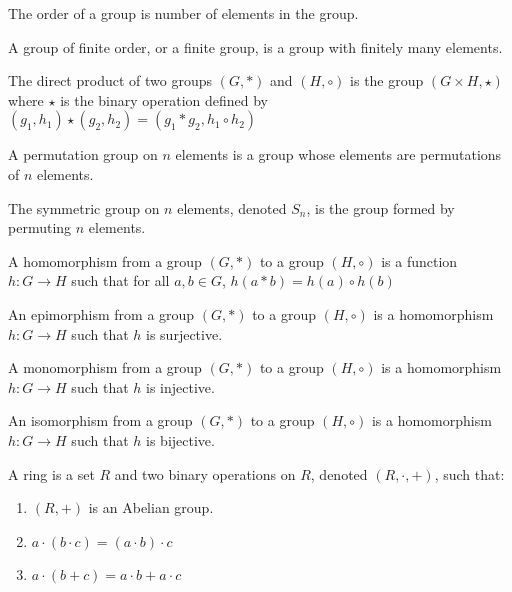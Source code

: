     \begin{definition}
        The order of a group is number of elements in the
        group.
    \end{definition}
    \begin{definition}
        A group of finite order, or a finite group,
        is a group with finitely many elements.
    \end{definition}
    \begin{definition}
        The direct product of two groups $(G,*)$ and
        $(H,\circ)$ is the group  $({G}\times{H},\star)$
        where $\star$ is the binary operation defined by
        $(g_{1},h_{1})\star(g_{2},h_{2})%
         =(g_{1}*g_{2},{h_{1}}\circ{h_{2}})$
    \end{definition}
    \begin{definition}
        A permutation group on $n$ elements is a
        group whose elements are permutations of
        $n$ elements.
    \end{definition}
    \begin{definition}
        The symmetric group on $n$ elements,
        denoted $S_{n}$, is the group formed by
        permuting $n$ elements.
    \end{definition}
    \begin{definition}
        A homomorphism from a group $(G,*)$ to
        a group $(H,\circ)$ is a function
        $h:{G}\rightarrow{H}$ such that for all
        ${a,b}\in{G}$, $h(a*b)={h(a)}\circ{h(b)}$
    \end{definition}
    \begin{definition}
        An epimorphism from a group $(G,*)$ to
        a group $(H,\circ)$ is a homomorphism
        $h:{G}\rightarrow{H}$ such that
        $h$ is surjective.
    \end{definition}
    \begin{definition}
        A monomorphism from a group $(G,*)$ to
        a group $(H,\circ)$ is a homomorphism
        $h:{G}\rightarrow{H}$ such that
        $h$ is injective.
    \end{definition}
    \begin{definition}
        An isomorphism from a group $(G,*)$ to
        a group $(H,\circ)$ is a homomorphism
        $h:{G}\rightarrow{H}$ such that
        $h$ is bijective.
    \end{definition}
    \begin{definition}
        A ring is a set $R$ and two binary operations
        on $R$, denoted $(R,\cdot,+)$, such that:
        \begin{enumerate}
            \item $(R,+)$ is an Abelian group.
            \item $a\cdot({b}\cdot{c})=({a}\cdot{b})\cdot{c}$
            \item ${a}\cdot(b+c)={a}\cdot{b}+{a}\cdot{c}$
        \end{enumerate}
    \end{definition}
